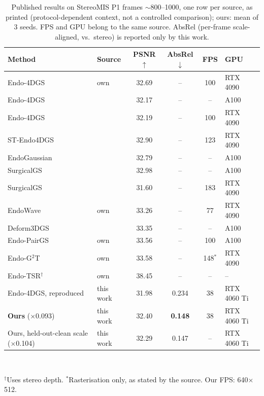 \documentclass[conference]{IEEEtran}
\begin{document}
\begin{table}[t]
\caption{Published results on StereoMIS P1 frames $\sim$800--1000, one row per source, as printed (protocol-dependent context, not a controlled comparison); ours: mean of 3 seeds. FPS and GPU belong to the same source. AbsRel (per-frame scale-aligned, vs.\ stereo) is reported only by this work.}
\label{tab:sameclip}
\centering
\scriptsize
\setlength{\tabcolsep}{1.9pt}
\begin{tabular}{@{}llcccl@{}}
\toprule
Method & Source & PSNR$\uparrow$ & AbsRel$\downarrow$ & FPS & GPU \\
\midrule
Endo-4DGS & own~\cite{huang2024endo4dgs} & 32.69 & -- & 100 & RTX 4090 \\
Endo-4DGS & \cite{yu2026endopairgs} & 32.17 & -- & -- & A100 \\
Endo-4DGS & \cite{liu2025endog2t} & 32.19 & -- & 100 & RTX 4090 \\
ST-Endo4DGS & \cite{liu2025endog2t} & 32.90 & -- & 123 & RTX 4090 \\
EndoGaussian & \cite{yu2026endopairgs} & 32.79 & -- & -- & A100 \\
SurgicalGS & \cite{yu2026endopairgs} & 32.98 & -- & -- & A100 \\
SurgicalGS & \cite{wu2025endowave} & 31.60 & -- & 183 & RTX 4090 \\
EndoWave & own~\cite{wu2025endowave} & 33.26 & -- & 77 & RTX 4090 \\
Deform3DGS & \cite{yu2026endopairgs} & 33.35 & -- & -- & A100 \\
Endo-PairGS & own~\cite{yu2026endopairgs} & 33.56 & -- & 100 & A100 \\
Endo-G$^2$T & own~\cite{liu2025endog2t} & 33.58 & -- & 148$^\ast$ & RTX 4090 \\
Endo-TSR$^\dagger$ & own~\cite{wu2026endotsr} & 38.45 & -- & -- & -- \\
\midrule
Endo-4DGS, reproduced & this work & 31.98 & 0.234 & 38 & RTX 4060 Ti \\
\rowcolor{ours!12} \textbf{Ours} ($\times$0.093) & this work & 32.40 & \textbf{0.148} & 38 & RTX 4060 Ti \\
Ours, held-out-clean scale ($\times$0.104) & this work & 32.29 & 0.147 & -- & RTX 4060 Ti \\
\bottomrule
\end{tabular}\\[2pt]
\raggedright\scriptsize $^\dagger$Uses stereo depth. $^\ast$Rasterisation only, as stated by the source. Our FPS: 640$\times$512.
\end{table}
\end{document}

